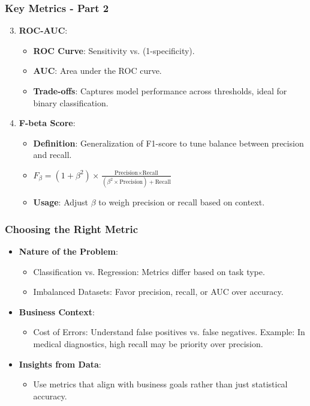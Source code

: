 \documentclass[aspectratio=169]{beamer}
\begin{document}
\begin{frame}[fragile]
    \frametitle{Key Metrics - Part 2}
    \begin{enumerate}
        \setcounter{enumi}{2} %
        \item \textbf{ROC-AUC}:
        \begin{itemize}
            \item \textbf{ROC Curve}: Sensitivity vs. (1-specificity).
            \item \textbf{AUC}: Area under the ROC curve.
            \item \textbf{Trade-offs}: Captures model performance across thresholds, ideal for binary classification.
        \end{itemize}
        
        \item \textbf{F-beta Score}:
        \begin{itemize}
            \item \textbf{Definition}: Generalization of F1-score to tune balance between precision and recall.
            \item \( F_\beta = (1 + \beta^2) \times \frac{\text{Precision} \times \text{Recall}}{(\beta^2 \times \text{Precision}) + \text{Recall}} \)
            \item \textbf{Usage}: Adjust \( \beta \) to weigh precision or recall based on context.
        \end{itemize}
    \end{enumerate}
\end{frame}

\begin{frame}[fragile]
    \frametitle{Choosing the Right Metric}
    \begin{itemize}
        \item \textbf{Nature of the Problem}:
        \begin{itemize}
            \item Classification vs. Regression: Metrics differ based on task type.
            \item Imbalanced Datasets: Favor precision, recall, or AUC over accuracy.
        \end{itemize}
        
        \item \textbf{Business Context}:
        \begin{itemize}
            \item Cost of Errors: Understand false positives vs. false negatives. Example: In medical diagnostics, high recall may be priority over precision.
        \end{itemize}

        \item \textbf{Insights from Data}:
        \begin{itemize}
            \item Use metrics that align with business goals rather than just statistical accuracy.
        \end{itemize}
    \end{itemize}
\end{frame}
\end{document}
